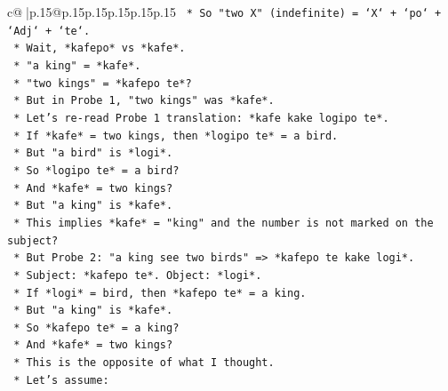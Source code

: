 \documentclass{article}
\begin{document}
{\begin{supertabular}{c@{$\;$}|p{.15\linewidth}@{}p{.15\linewidth}p{.15\linewidth}p{.15\linewidth}p{.15\linewidth}p{.15\linewidth}}
{{{\texttt{                                    *   So "two X" (indefinite) = `X` + `po` + `Adj` + `te`.} \\
\texttt{                                    *   Wait, *kafepo* vs *kafe*.} \\
\texttt{                                    *   "a king" = *kafe*.} \\
\texttt{                                    *   "two kings" = *kafepo te*?} \\
\texttt{                                    *   But in Probe 1, "two kings" was *kafe*.} \\
\texttt{                                    *   Let's re{-}read Probe 1 translation: *kafe kake logipo te*.} \\
\texttt{                                        *   If *kafe* = two kings, then *logipo te* = a bird.} \\
\texttt{                                        *   But "a bird" is *logi*.} \\
\texttt{                                        *   So *logipo te* = a bird?} \\
\texttt{                                        *   And *kafe* = two kings?} \\
\texttt{                                        *   But "a king" is *kafe*.} \\
\texttt{                                        *   This implies *kafe* = "king" and the number is not marked on the subject?} \\
\texttt{                                        *   But Probe 2: "a king see two birds" => *kafepo te kake logi*.} \\
\texttt{                                            *   Subject: *kafepo te*. Object: *logi*.} \\
\texttt{                                            *   If *logi* = bird, then *kafepo te* = a king.} \\
\texttt{                                            *   But "a king" is *kafe*.} \\
\texttt{                                            *   So *kafepo te* = a king?} \\
\texttt{                                            *   And *kafe* = two kings?} \\
\texttt{                                            *   This is the opposite of what I thought.} \\
\texttt{                                            *   Let's assume:} \\
}}}
\end{supertabular}}
\end{document}
